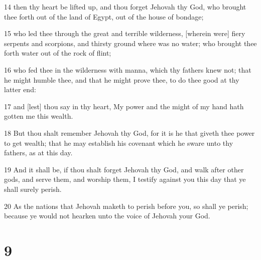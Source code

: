 \par 14 then thy heart be lifted up, and thou forget Jehovah thy God, who brought thee forth out of the land of Egypt, out of the house of bondage;
\par 15 who led thee through the great and terrible wilderness, [wherein were] fiery serpents and scorpions, and thirsty ground where was no water; who brought thee forth water out of the rock of flint;
\par 16 who fed thee in the wilderness with manna, which thy fathers knew not; that he might humble thee, and that he might prove thee, to do thee good at thy latter end:
\par 17 and [lest] thou say in thy heart, My power and the might of my hand hath gotten me this wealth.
\par 18 But thou shalt remember Jehovah thy God, for it is he that giveth thee power to get wealth; that he may establish his covenant which he sware unto thy fathers, as at this day.
\par 19 And it shall be, if thou shalt forget Jehovah thy God, and walk after other gods, and serve them, and worship them, I testify against you this day that ye shall surely perish.
\par 20 As the nations that Jehovah maketh to perish before you, so shall ye perish; because ye would not hearken unto the voice of Jehovah your God.

\chapter{9}

